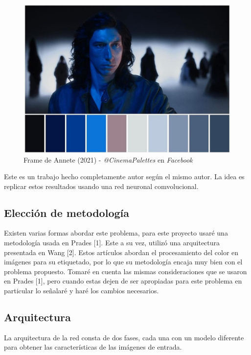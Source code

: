 \documentclass[14pt,a4paper]{report}
\begin{document}
\begin{figure}[h]
  \centering
\includegraphics[scale=0.4]{../paleta-colores.jpg} 
  \caption{Frame de Annete (2021) - \textit{@CinemaPalettes} en \textit{Facebook}}
  \label{fig:neural-network}
\end{figure}

Este es un trabajo hecho completamente autor según el mismo autor. La idea es replicar estos resultados usando una red neuronal comvolucional.

\subsection*{Elección de metodología}

Existen varias formas abordar este problema, para este proyecto usaré una metodología usada en Prades [1]. Este a su vez, utilizó una arquitectura presentada en Wang [2]. Estos artículos abordan el procesamiento del color en imágenes para su etiquetado, por lo que su metodología encaja muy bien con el problema propuesto. Tomaré en cuenta las mismas consideraciones que se usaron en Prades [1], pero cuando estas dejen de ser apropiadas para este problema en particular lo señalaré y haré los cambios necesarios.

\subsection*{Arquitectura}

La arquitectura de la red consta de dos fases, cada una con un modelo diferente para obtener las características de las imágenes de entrada.
\end{document}
